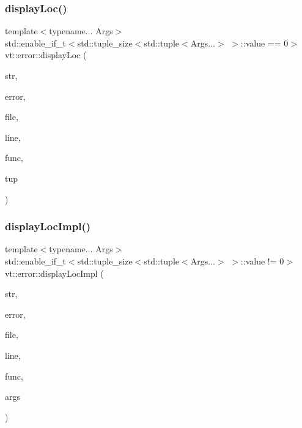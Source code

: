 \mbox{\label{namespacevt_1_1error_a31898d4bf9f25ed8f7ae4d71724580fc}} 
\subsubsection{\texorpdfstring{display\+Loc()}{displayLoc()}\hspace{0.1cm}{\footnotesize\ttfamily [3/3]}}
{\footnotesize\ttfamily template$<$typename... Args$>$ \\
std\+::enable\+\_\+if\+\_\+t$<$std\+::tuple\+\_\+size$<$std\+::tuple$<$Args...$>$ $>$\+::value == 0$>$ vt\+::error\+::display\+Loc (\begin{DoxyParamCaption}\item[{std\+::string const \&}]{str,  }\item[{\hyperlink{namespacevt_a793764d753923abc3d32929870beb485}{Error\+Code\+Type}}]{error,  }\item[{std\+::string const \&}]{file,  }\item[{int const}]{line,  }\item[{std\+::string const \&}]{func,  }\item[{\mbox{[}\mbox{[}maybe\+\_\+unused\mbox{]} \mbox{]} std\+::tuple$<$ Args... $>$ \&\&}]{tup }\end{DoxyParamCaption})\hspace{0.3cm}{\ttfamily [inline]}}

\mbox{\label{namespacevt_1_1error_a72bed290e73b0ff6a5f0c769c14c82f5}} 
\subsubsection{\texorpdfstring{display\+Loc\+Impl()}{displayLocImpl()}}
{\footnotesize\ttfamily template$<$typename... Args$>$ \\
std\+::enable\+\_\+if\+\_\+t$<$std\+::tuple\+\_\+size$<$std\+::tuple$<$Args...$>$ $>$\+::value != 0$>$ vt\+::error\+::display\+Loc\+Impl (\begin{DoxyParamCaption}\item[{std\+::string const \&}]{str,  }\item[{\hyperlink{namespacevt_a793764d753923abc3d32929870beb485}{Error\+Code\+Type}}]{error,  }\item[{std\+::string const \&}]{file,  }\item[{int const}]{line,  }\item[{std\+::string const \&}]{func,  }\item[{Args \&\&...}]{args }\end{DoxyParamCaption})\hspace{0.3cm}{\ttfamily [inline]}}

